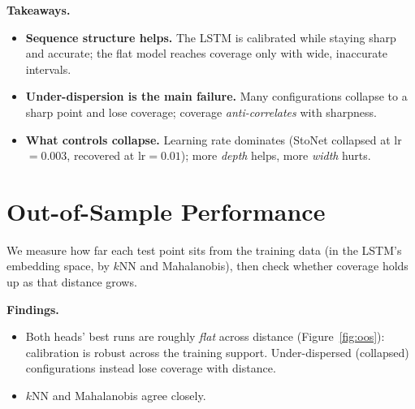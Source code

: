 \documentclass[11pt]{article}
\begin{document}
\noindent
\textbf{Takeaways.}
\begin{itemize}
  \item \textbf{Sequence structure helps.} The LSTM is calibrated while staying
  sharp and accurate; the flat model reaches coverage only with wide, inaccurate
  intervals.
  \item \textbf{Under-dispersion is the main failure.} Many configurations collapse
  to a sharp point and lose coverage; coverage \emph{anti-correlates} with
  sharpness.
  \item \textbf{What controls collapse.} Learning rate dominates (StoNet collapsed
  at lr$=0.003$, recovered at lr$=0.01$); more \emph{depth} helps, more \emph{width}
  hurts.
\end{itemize}

\section{Out-of-Sample Performance}

We measure how far each test point sits from the training data (in the LSTM's
embedding space, by $k$NN and Mahalanobis), then check whether coverage holds up as that
distance grows.

\medskip
\noindent
\textbf{Findings.}
\begin{itemize}
  \item Both heads' best runs are roughly \emph{flat} across distance
  (Figure~\ref{fig:oos}): calibration is robust across the training support.
  Under-dispersed (collapsed) configurations instead lose coverage with distance.
  \item $k$NN and Mahalanobis agree closely.
\end{itemize}
\end{document}

